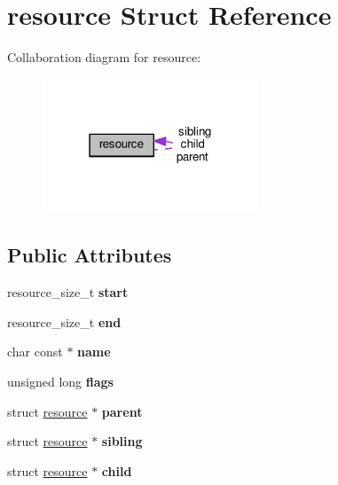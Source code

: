 \hypertarget{structresource}{}\section{resource Struct Reference}
\label{structresource}


Collaboration diagram for resource\+:
\nopagebreak
\begin{figure}[H]
\begin{center}
\leavevmode
\includegraphics[width=183pt]{structresource__coll__graph}
\end{center}
\end{figure}
\subsection*{Public Attributes}
\begin{DoxyCompactItemize}
\item 
\hypertarget{structresource_a27ef3a1ffd33dd84060c83f35817c33c}{}resource\+\_\+size\+\_\+t {\bfseries start}\label{structresource_a27ef3a1ffd33dd84060c83f35817c33c}

\item 
\hypertarget{structresource_a2bada202b4e2ced2eff55fb302242ccd}{}resource\+\_\+size\+\_\+t {\bfseries end}\label{structresource_a2bada202b4e2ced2eff55fb302242ccd}

\item 
\hypertarget{structresource_a049bfaa07bb0cfa22f557a19984663d6}{}char const $\ast$ {\bfseries name}\label{structresource_a049bfaa07bb0cfa22f557a19984663d6}

\item 
\hypertarget{structresource_a0269244c016ba71489f581cb368d8fe7}{}unsigned long {\bfseries flags}\label{structresource_a0269244c016ba71489f581cb368d8fe7}

\item 
\hypertarget{structresource_a5808ce2f70bd0531db5247ea42087caa}{}struct \hyperlink{structresource}{resource} $\ast$ {\bfseries parent}\label{structresource_a5808ce2f70bd0531db5247ea42087caa}

\item 
\hypertarget{structresource_a321ed2e7bb21e5a52f89ef4a6cf09798}{}struct \hyperlink{structresource}{resource} $\ast$ {\bfseries sibling}\label{structresource_a321ed2e7bb21e5a52f89ef4a6cf09798}

\item 
\hypertarget{structresource_abf731166689708c418dea4423a86b4c2}{}struct \hyperlink{structresource}{resource} $\ast$ {\bfseries child}\label{structresource_abf731166689708c418dea4423a86b4c2}

\end{DoxyCompactItemize}


